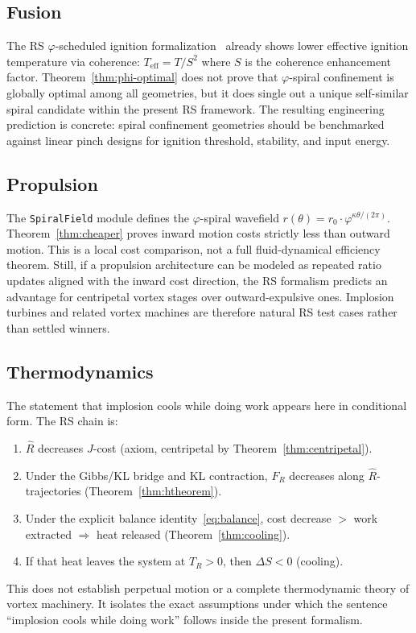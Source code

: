 \documentclass[11pt,a4paper]{article}
\theoremstyle{definition}
\newcommand{\phig}{\varphi}
\newcommand{\Jc}{J}
\newcommand{\Rhat}{\hat{R}}
\newcommand{\FR}{F_{\!R}}
\newcommand{\TR}{T_{\!R}}
\newcommand{\code}[1]{\texttt{\small #1}}
\begin{document}
\subsection{Fusion}

The RS $\phig$-scheduled ignition formalization~\cite{RSFusion2026} already
shows lower effective ignition temperature via coherence:
$T_{\mathrm{eff}} = T/S^2$ where $S$ is the coherence enhancement factor.
Theorem~\ref{thm:phi-optimal} does not prove that $\phig$-spiral confinement is
globally optimal among all geometries, but it does single out a unique
self-similar spiral candidate within the present RS framework.  The resulting
engineering prediction is concrete: spiral confinement geometries should be
benchmarked against linear pinch designs for ignition threshold, stability,
and input energy.

\subsection{Propulsion}

The \code{SpiralField} module defines the $\phig$-spiral wavefield
$r(\theta) = r_0 \cdot \phig^{\kappa\theta/(2\pi)}$.
Theorem~\ref{thm:cheaper} proves inward motion costs strictly less than
outward motion.  This is a local cost comparison, not a full
fluid-dynamical efficiency theorem.  Still, if a propulsion architecture can
be modeled as repeated ratio updates aligned with the inward cost direction,
the RS formalism predicts an advantage for centripetal vortex stages over
outward-expulsive ones.  Implosion turbines and related vortex machines are
therefore natural RS test cases rather than settled winners.

\subsection{Thermodynamics}

The statement that implosion cools while doing work appears here in conditional
form.  The RS chain is:
\begin{enumerate}[leftmargin=2em]
  \item $\Rhat$ decreases $\Jc$-cost (axiom, centripetal by Theorem~\ref{thm:centripetal}).
  \item Under the Gibbs/KL bridge and KL contraction, $\FR$ decreases along
        $\Rhat$-trajectories (Theorem~\ref{thm:htheorem}).
  \item Under the explicit balance identity~\eqref{eq:balance}, cost decrease
        $>$ work extracted $\Rightarrow$ heat released
        (Theorem~\ref{thm:cooling}).
  \item If that heat leaves the system at $\TR > 0$, then $\Delta S < 0$
        (cooling).
\end{enumerate}
This does not establish perpetual motion or a complete thermodynamic theory of
vortex machinery.  It isolates the exact assumptions under which the sentence
``implosion cools while doing work'' follows inside the present formalism.
\end{document}
